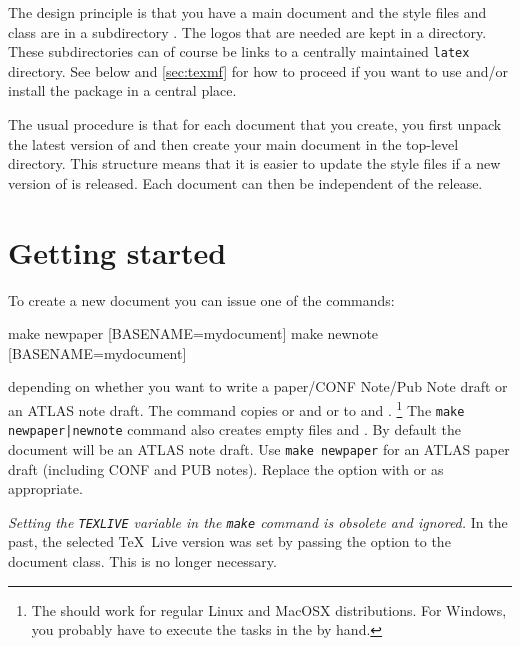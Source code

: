 The design principle is that you have a main document and 
the style files and  class are in a subdirectory .
The logos that are needed are kept in a  directory.
These subdirectories can of course be links to a centrally maintained \texttt{latex} directory.
See below and \cref{sec:texmf} for how to proceed if you want to use and/or install
the package in a central place.

The usual procedure is that for each document that you create,
you first unpack the latest version of  and
then create your main document in the top-level directory.
This structure means that it is easier to update the style files if a new version of
 is released. 
Each document can then be independent of the  release.

\section{Getting started}

To create a new document you can issue one of the commands:
%
\begin{bashlisting}
make newpaper [BASENAME=mydocument]
make newnote [BASENAME=mydocument]
\end{bashlisting}
depending on whether you want to write a paper/CONF Note/Pub Note draft or
an ATLAS note draft.
%
The command copies  or  and
 or 
to  and .%
\footnote{The  should work for regular Linux and MacOSX distributions.
For Windows, you probably have to execute the tasks in the  by hand.}
The \texttt{make newpaper|newnote} command also creates empty files  and .
By default the document will be an ATLAS note draft.
Use \texttt{make newpaper} for an ATLAS paper draft (including CONF and PUB notes).
Replace the option  with  or  as appropriate.

\emph{ Setting the \texttt{TEXLIVE} variable in the \texttt{make} command
is obsolete and ignored.}
In the past, the selected \TeX\ Live version was set by passing the
 option to the document class.
This is no longer necessary.

